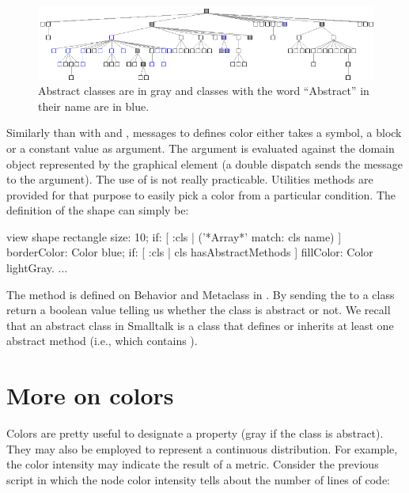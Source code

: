 \documentclass[a4paper,10pt,twoside]{book}
\begin{document}
\begin{figure}[htbp]
\centerline{\includegraphics[width=\linewidth]{arrayClasses}}
\caption{Abstract classes are in gray and classes with the word ``Abstract'' in their name are in blue.}
\label{fig:abstractClasses}
\end{figure}

Similarly than with  and , messages to defines color either takes a symbol, a block or a constant value as argument. The argument is evaluated against the domain object represented by the graphical element (a double dispatch sends the message  to the argument). 
The use of  is not really practicable. Utilities methods are provided for that purpose to easily pick a color from a particular condition. The definition of the shape can simply be:

\begin{code}{}
view shape rectangle
	size: 10;
	if: [ :cls | ('*Array*' match: cls name) ] borderColor: Color blue;
	if: [ :cls | cls hasAbstractMethods ] fillColor: Color lightGray.
...
\end{code}

The method  is defined on Behavior and Metaclass in \pharo. By sending the  to a class return a boolean value telling us whether the class is abstract or not. We recall that an abstract class in Smalltalk is a class that defines or inherits at least one  abstract method (i.e., which contains ).



\section{More on colors}

Colors are pretty useful to designate a property (\eg gray if the class is abstract). They may also be employed to represent a continuous distribution. For example, the color intensity may indicate the result of a metric. Consider the previous script in which the node color intensity tells about the number of lines of code:
\end{document}

